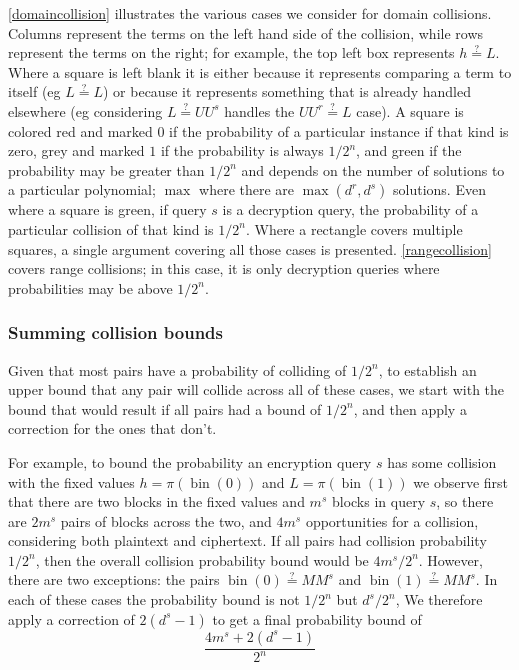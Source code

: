 \documentclass[letterpaper,11pt]{article}
\newcommand*{\MM}{\mathit{MM}}
\newcommand*{\qeq}{\stackrel{\text{?}}{=}}
\newcommand*{\UU}{\mathit{UU}}
\DeclareMathOperator{\fromint}{bin}
\begin{document}
\autoref{domaincollision} illustrates the various cases
we consider for domain collisions.
Columns represent the terms
on the left hand side of the collision, while
rows represent the terms on the right; 
for example, the top left box represents
\(h \qeq L\). Where a square is left blank
it is either because it represents
comparing a term to itself (eg \(L \qeq L\))
or because it represents something that
is already handled elsewhere
(eg considering \(L \qeq \UU^s\)
handles the \(\UU^r \qeq L\) case).
A square is colored red
and marked \(0\) if the
probability of a particular instance
if that kind is zero, grey
and marked \(1\) if
the probability is always \(1/2^n\),
and green if the probability may be
greater than \(1/2^n\) and depends
on the number of solutions to a
particular polynomial;
\(\max\) where there are
\(\max(d^r, d^s)\) solutions.
Even where a square is green,
if query \(s\) is a decryption query,
the probability of a particular collision of
that kind is \(1/2^n\).
Where a rectangle covers
multiple squares, a single argument
covering all those cases is presented.
\autoref{rangecollision} covers
range collisions; in this case,
it is only decryption queries where
probabilities may be above \(1/2^n\).


\subsubsection{Summing collision bounds}
Given that most pairs have a probability of
colliding of \(1/2^n\), 
to establish an upper bound that any pair
will collide across all of these cases,
we start with the bound that would result
if all pairs had a bound of \(1/2^n\),
and then apply a correction for the ones that don't.

For example,
to bound the probability an encryption query \(s\)
has some collision with the fixed values
\(h = \pi(\fromint(0))\) and \(L = \pi(\fromint(1))\)
we observe first that
there are two blocks in the fixed values
and \(m^s\) blocks in query \(s\), so there are
\(2m^s\) pairs of blocks across the two,
and \(4m^s\) opportunities for a collision, 
considering both plaintext and ciphertext.
If all pairs had collision probability \(1/2^n\),
then the overall collision probability bound
would be \(4m^s/2^n\). However, there are
two exceptions: the pairs
\(\fromint(0) \qeq \MM^s\) and
\(\fromint(1) \qeq \MM^s\). In each of these
cases the probability bound is not \(1/2^n\) but
\(d^s/2^n\), We therefore apply a correction
of \(2(d^s - 1)\) to get a final probability bound of
\begin{displaymath}
    \frac{4m^s + 2(d^s - 1)}{2^n}
\end{displaymath}
\end{document}
